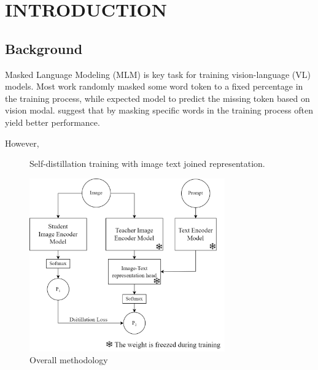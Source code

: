 \setlength{\parindent}{0in}
\setlength{\parskip}{1.5mm}
\setlength{\baselineskip}{1.6em}

\chapter{INTRODUCTION}
\section{Background}
Masked Language Modeling (MLM) is key task for training vision-language (VL) models\cite{albef, mplug, uniter, beit-3}.
Most work randomly masked some word token to a fixed percentage in the training process, while expected model to predict the missing token based on vision modal.
 suggest that by masking specific words in the training process often yield better performance.


However, 


\begin{figure}[h]
    \caption{Overall methodology}
    \label{fig:overall_method}
    Self-distillation training with image text joined representation.
    \begin{center}
        \includegraphics[width=0.75\textwidth]{Images/OverviewMethod.png}
    \end{center}
    \small
\end{figure}
